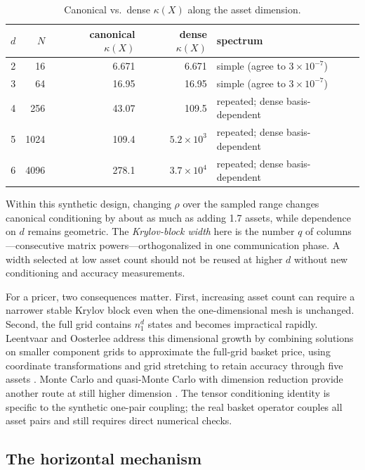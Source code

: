 \begin{table}[htbp!]
\centering
\caption{Canonical vs.\ dense $\kappa(X)$ along the asset dimension.}
\label{tab:dsweep}
\begin{tabular}{@{}rrrrl@{}}
\toprule
$d$ & $N$ & \textbf{canonical} $\kappa(X)$ & \textbf{dense} $\kappa(X)$ & \textbf{spectrum} \\
\midrule
2 & 16 & 6.671 & 6.671 & simple (agree to $3\times 10^{-7}$) \\
3 & 64 & 16.95 & 16.95 & simple (agree to $3\times 10^{-7}$) \\
4 & 256 & 43.07 & 109.5 & repeated; dense basis-dependent \\
5 & 1024 & 109.4 & $5.2\times 10^3$ & repeated; dense basis-dependent \\
6 & 4096 & 278.1 & $3.7\times 10^4$ & repeated; dense basis-dependent \\
\bottomrule
\end{tabular}
\end{table}

Within this synthetic design, changing $\rho$ over the sampled range changes canonical conditioning by about as much as adding 1.7 assets, while dependence on $d$ remains geometric. The \emph{Krylov-block width} here is the number $q$ of columns---consecutive matrix powers---orthogonalized in one communication phase. A width selected at low asset count should not be reused at higher $d$ without new conditioning and accuracy measurements.

For a pricer, two consequences matter. First, increasing asset count can require a narrower stable Krylov block even when the one-dimensional mesh is unchanged. Second, the full grid contains $n_1^d$ states and becomes impractical rapidly. Leentvaar and Oosterlee address this dimensional growth by combining solutions on smaller component grids to approximate the full-grid basket price, using coordinate transformations and grid stretching to retain accuracy through five assets \cite{leentvaar-oosterlee-2008}. Monte Carlo and quasi-Monte Carlo with dimension reduction provide another route at still higher dimension \cite{wang-2009,weng-wang-he-2017}. The tensor conditioning identity is specific to the synthetic one-pair coupling; the real basket operator couples all asset pairs and still requires direct numerical checks.

\subsection{The horizontal mechanism}\label{sec:horizontal}

